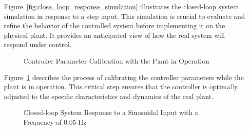 \documentclass[conference,onecolumn]{IEEEtran}
\begin{document}
Figure~\ref{fig:close_loop_response_simulation} illustrates the closed-loop system simulation in response to a step input. This simulation is crucial to evaluate and refine the behavior of the controlled system before implementing it on the physical plant. It provides an anticipated view of how the real system will respond under control.

\begin{figure}[H]
    \centering
    \caption{Controller Parameter Calibration with the Plant in Operation}
    \label{fig:close_loop_pid_calibration}
\end{figure}
Figure~\ref{fig:close_loop_pid_calibration} describes the process of calibrating the controller parameters while the plant is in operation. This critical step ensures that the controller is optimally adjusted to the specific characteristics and dynamics of the real plant.

\begin{figure}[H]
    \centering
    \caption{Closed-loop System Response to a Sinusoidal Input with a Frequency of 0.05 Hz}
    \label{fig:close_loop_sine_response}
\end{figure}
\end{document}
